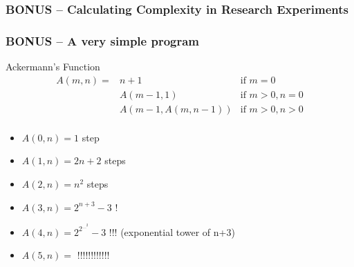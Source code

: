 \begin{frame}
  \frametitle{BONUS -- Calculating Complexity in Research Experiments}
\end{frame}

\begin{frame}
  \frametitle{BONUS -- A very simple program}

  \begin{block}{Ackermann's Function}
    \begin{eqnarray*}
      A(m,n) = & n+1 & \text{if } m = 0\\
      & A(m-1,1) & \text{if } m > 0, n = 0\\
      & A(m-1,A(m,n-1)) & \text{if } m > 0, n > 0\\
    \end{eqnarray*}
  \end{block}

  \begin{itemize}
    \item $A(0,n) = 1$ step
    \item $A(1,n) = 2n+2$ steps
    \item $A(2,n) = n^2$ steps
    \item $A(3,n) = 2^{n+3}-3$ \alert{!}
    \item $A(4,n) = 2^{2^{...^2}}-3$ \alert{!!!} (exponential tower of n+3)
    \item $A(5,n) = $ \alert{!!!!!!!!!!!!}
  \end{itemize}
\end{frame}
